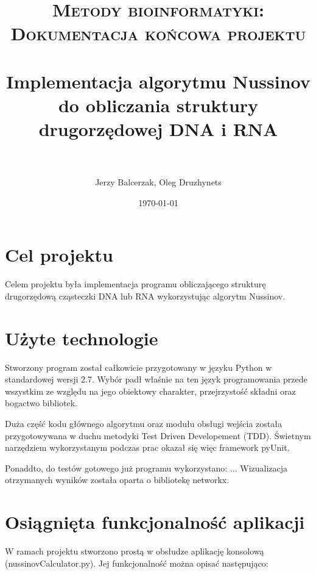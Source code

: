\documentclass[paper=a4, fontsize=11pt]{scrartcl} %
\title{	
\normalfont \normalsize 
\textsc{Metody bioinformatyki: Dokumentacja końcowa projektu} \\ [25pt] %
\horrule{0.5pt} \\[0.4cm] %
\huge Implementacja algorytmu Nussinov do obliczania struktury drugorzędowej DNA i RNA \\ %
\horrule{2pt} \\[0.5cm] %
}
\author{Jerzy Balcerzak,
Oleg Druzhynets} %
\date{\normalsize\today} %
\numberwithin{equation}{section} %
\numberwithin{figure}{section} %
\numberwithin{table}{section} %
\begin{document}
\maketitle %


\section{Cel projektu}

	Celem projektu była implementacja programu obliczającego strukturę drugorzędową cząsteczki DNA lub RNA wykorzystując algorytm Nussinov.





\section{Użyte technologie}

Stworzony program został całkowicie przygotowany w języku Python w standardowej wersji 2.7. Wybór padł właśnie na ten język programowania przede wszystkim ze względu na jego obiektowy charakter, przejrzystość składni oraz bogactwo bibliotek. 

Duża część kodu głównego algorytmu oraz modułu obsługi wejścia została przygotowywana w duchu metodyki Test Driven Developement (TDD). Świetnym narzędziem wykorzystanym podczas prac okazał się więc framework pyUnit.

Ponaddto, do testów gotowego już programu wykorzystano: ... Wizualizacja otrzymanych wyników została oparta o bibliotekę networkx.

\section{Osiągnięta funkcjonalność aplikacji}

W ramach projektu stworzono prostą w obsłudze aplikację konsolową (nussinovCalculator.py). Jej funkcjonalność można opisać następująco:
\end{document}

